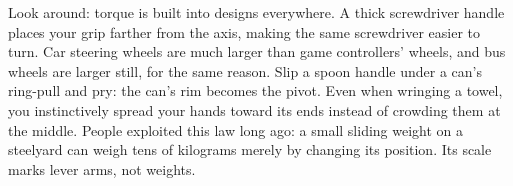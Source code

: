 \begin{mainline}
Look around: torque is built into designs everywhere. A thick screwdriver handle places your grip farther from the axis, making the same screwdriver easier to turn. Car steering wheels are much larger than game controllers' wheels, and bus wheels are larger still, for the same reason. Slip a spoon handle under a can's ring-pull and pry: the can's rim becomes the pivot. Even when wringing a towel, you instinctively spread your hands toward its ends instead of crowding them at the middle. People exploited this law long ago: a small sliding weight on a steelyard can weigh tens of kilograms merely by changing its position. Its scale marks lever arms, not weights.
\end{mainline}

\begin{center}
\end{center}

